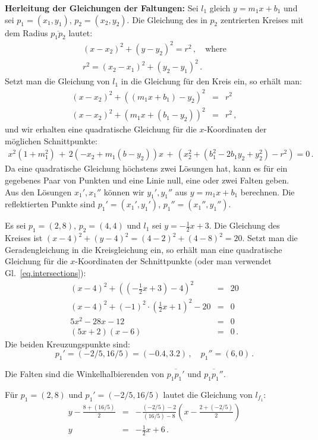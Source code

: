 \noindent\textbf{Herleitung der Gleichungen der Faltungen:}
Sei $l_1$ gleich $y=m_1x + b_1$ und sei $p_1=(x_1,y_1)$, $p_2=(x_2,y_2)$. Die Gleichung des in $p_2$ zentrierten Kreises mit dem Radius $\overline{p_1p_2}$ lautet:
\begin{eqnarray*}
(x-x_2)^2 + (y-y_2)^2 = r^2\,,\quad \textrm{where}\\
r^2= (x_2-x_1)^2 + (y_2-y_1)^2\,.
\end{eqnarray*}
Setzt man die Gleichung von $l_1$ in die Gleichung für den Kreis ein, so erhält man:
\begin{eqnarray*}
(x-x_2)^2+((m_1x+b_1)-y_2)^2&=&r^2\\
(x-x_2)^2+(m_1x+(b_1-y_2))^2&=&r^2\,,
\end{eqnarray*}
und wir erhalten eine quadratische Gleichung für die $x$-Koordinaten der möglichen Schnittpunkte:
\begin{align}
x^2(1+m_1^2) \,+\, 2(-x_2+m_1(b-y_2))x \,+\,(x_2^2 + (b_1^2 - 2b_1y_2+y_2^2)-r^2)=0\,.\label{eq.intersections}
\end{align}
Da eine quadratische Gleichung höchstens zwei Lösungen hat, kann es für ein gegebenes Paar von Punkten und eine Linie null, eine oder zwei Falten geben. Aus den Lösungen $x_1',x_1''$ können wir $y_1',y_1''$ aus $y=m_1x+b_1$ berechnen. Die reflektierten Punkte sind $p_1'=(x_1',y_1')$, $p_1''=(x_1'',y_1'')$.
\begin{example}
Es sei $p_1=(2,8)$, $p_2=(4,4)$ und $l_1$ sei $y=-\frac{1}{2}x +3$. Die Gleichung des Kreises ist $(x-4)^2 + (y-4)^2 = (4-2)^2+(4-8)^2=20$. Setzt man die Geradengleichung in die Kreisgleichung ein, so erhält man eine quadratische Gleichung für die $x$-Koordinaten der Schnittpunkte (oder man verwendet Gl.~\ref{eq.intersections}):
\begin{eqnarray*}
(x-4)^2 + \left(\left(-\frac{1}{2}x+3\right)-4\right)^2&=&20\\
(x-4)^2 + (-1)^2\cdot\left(\frac{1}{2}x+1\right)^2-20&=&0\\
5x^2 -28x -12&=&0\\
(5x+2)(x-6)&=&0\,.
\end{eqnarray*}
Die beiden Kreuzungspunkte sind:
\[
p_1'=(-2/5,16/5) = (-0.4,3.2)\,,\quad p_1''=(6,0)\,.
\]
\end{example}
Die Falten sind die Winkelhalbierenden von $\overline{p_1p_1'}$ und $\overline{p_1p_1''}$.
\begin{example}
Für $p_1=(2,8)$ und $p_1'=(-2/5,16/5)$ lautet die Gleichung von $l_{f_1}$:
\begin{eqnarray*}
y-\frac{8+(16/5)}{2}&=&-\frac{(-2/5)-2}{(16/5)-8}\left(x-\frac{2+\left(-2/5\right)}{2}\right)\\
y&=&-\frac{1}{2}x+6\,.
\end{eqnarray*}
\end{example}

